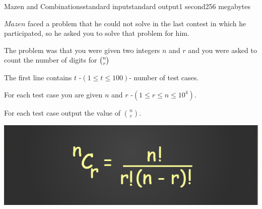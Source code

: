\begin{problem}{Mazen and Combinations}{standard input}{standard output}{1 second}{256 megabytes}

$ Mazen$ faced a problem that he could not solve in the last contest in which he participated, so he asked you to solve that problem for him.

The problem was that you were given two integers $n$ and $r$ and you were asked to count the number of digits for $\large\binom{n}{r}$

\InputFile
The first line contains $t$ -$(1 \le t \le 100) $- number of test cases.

For each test case you are given $n$ and $r$ -$(1\le r \le n \le 10^4) $.

\OutputFile
For each test case output the value of $\binom{n}{r}$.

\Example

\begin{example}
%
\end{example}

\Note
\includegraphics{combinations.jpg}

\end{problem}

